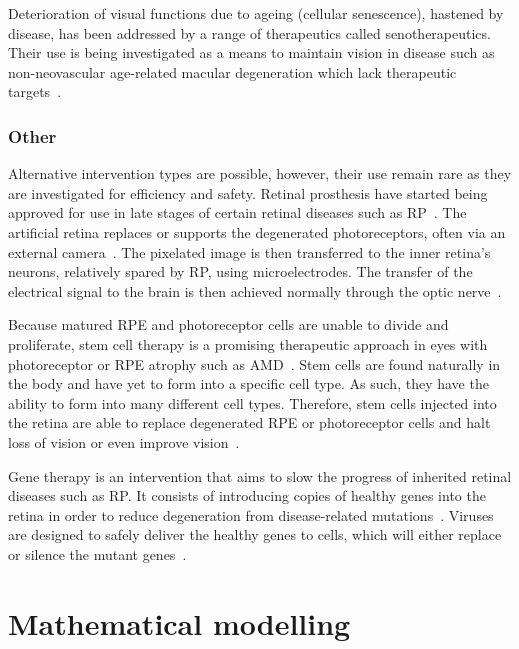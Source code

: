 \documentclass{article}
\begin{document}
Deterioration of visual functions due to ageing (cellular senescence), hastened by disease, has been addressed by a range of therapeutics called senotherapeutics.
Their use is being investigated as a means to maintain vision in disease such as non-neovascular age-related macular degeneration which lack therapeutic targets~\cite{Lee_2021}.


\subsubsection{Other}

Alternative intervention types are possible, however, their use remain rare as they are investigated for efficiency and safety.
Retinal prosthesis have started being approved for use in late stages of certain retinal diseases such as RP~\cite{Luo_2016}.
The artificial retina replaces or supports the degenerated photoreceptors, often via an external camera~\cite{Luo_2016,Stingl_2017}.
The pixelated image is then transferred to the inner retina's neurons, relatively spared by RP, using microelectrodes.
The transfer of the electrical signal to the brain is then achieved normally through the optic nerve~\cite{Luo_2016,Stingl_2017}.

Because matured RPE and photoreceptor cells are unable to divide and proliferate, stem cell therapy is a promising therapeutic approach in eyes with photoreceptor or RPE atrophy such as AMD~\cite{Berta_2011,Stern_2015}.
Stem cells are found naturally in the body and have yet to form into a specific cell type.
As such, they have the ability to form into many different cell types.
Therefore, stem cells injected into the retina are able to replace degenerated RPE or photoreceptor cells and halt loss of vision or even improve vision~\cite{ONeill_2020}.

Gene therapy is an intervention that aims to slow the progress of inherited retinal diseases such as RP.
It consists of introducing copies of healthy genes into the retina in order to reduce degeneration from disease-related mutations~\cite{Battu_2022}.
Viruses are designed to safely deliver the healthy genes to cells, which will either replace or silence the mutant genes~\cite{Battu_2022}.








\section{Mathematical modelling}\label{sec:MathematicalPrimer}
\end{document}
